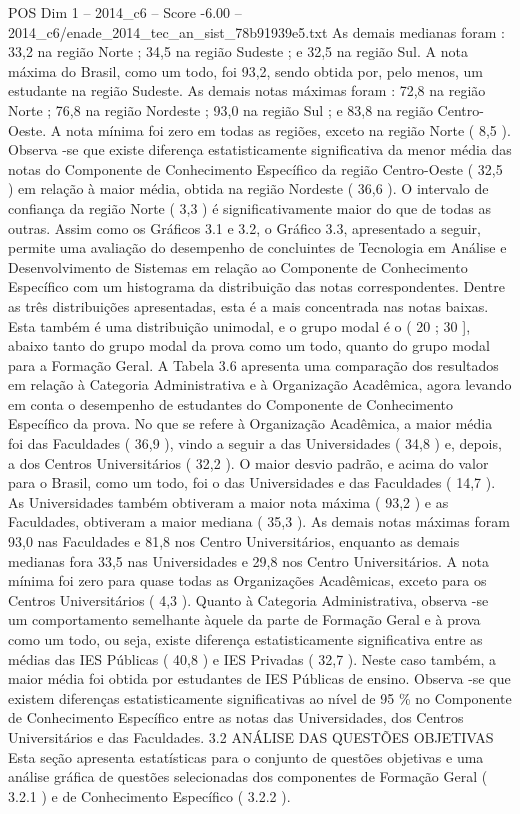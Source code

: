 \begin{textsample}{POS Dim 1 – 2014\_c6 – Score -6.00 – 2014\_c6/enade\_2014\_tec\_an\_sist\_78b91939e5.txt}
As demais medianas foram : 33,2 na região Norte ; 34,5 na região Sudeste ; e 32,5 na região Sul.
A nota máxima do Brasil, como um todo, foi 93,2, sendo obtida por, pelo menos, um estudante na região Sudeste.
As demais notas máximas foram : 72,8 na região Norte ; 76,8 na região Nordeste ; 93,0 na região Sul ; e 83,8 na região Centro-Oeste.
A nota mínima foi zero em todas as regiões, exceto na região Norte ( 8,5 ).
Observa -se que existe diferença estatisticamente significativa da menor média das notas do Componente de Conhecimento Específico da região Centro-Oeste ( 32,5 ) em relação à maior média, obtida na região Nordeste ( 36,6 ).
O intervalo de confiança da região Norte ( 3,3 ) é significativamente maior do que de todas as outras.
Assim como os Gráficos 3.1 e 3.2, o Gráfico 3.3, apresentado a seguir, permite uma avaliação do desempenho de concluintes de Tecnologia em Análise e Desenvolvimento de Sistemas em relação ao Componente de Conhecimento Específico com um histograma da distribuição das notas correspondentes.
Dentre as três distribuições apresentadas, esta é a mais concentrada nas notas baixas.
Esta também é uma distribuição unimodal, e o grupo modal é o ( 20 ; 30 ], abaixo tanto do grupo modal da prova como um todo, quanto do grupo modal para a Formação Geral.
A Tabela 3.6 apresenta uma comparação dos resultados em relação à Categoria Administrativa e à Organização Acadêmica, agora levando em conta o desempenho de estudantes do Componente de Conhecimento Específico da prova.
No que se refere à Organização Acadêmica, a maior média foi das Faculdades ( 36,9 ), vindo a seguir a das Universidades ( 34,8 ) e, depois, a dos Centros Universitários ( 32,2 ).
O maior desvio padrão, e acima do valor para o Brasil, como um todo, foi o das Universidades e das Faculdades ( 14,7 ).
As Universidades também obtiveram a maior nota máxima ( 93,2 ) e as Faculdades, obtiveram a maior mediana ( 35,3 ).
As demais notas máximas foram 93,0 nas Faculdades e 81,8 nos Centro Universitários, enquanto as demais medianas fora 33,5 nas Universidades e 29,8 nos Centro Universitários.
A nota mínima foi zero para quase todas as Organizações Acadêmicas, exceto para os Centros Universitários ( 4,3 ).
Quanto à Categoria Administrativa, observa -se um comportamento semelhante àquele da parte de Formação Geral e à prova como um todo, ou seja, existe diferença estatisticamente significativa entre as médias das IES Públicas ( 40,8 ) e IES Privadas ( 32,7 ).
Neste caso também, a maior média foi obtida por estudantes de IES Públicas de ensino.
Observa -se que existem diferenças estatisticamente significativas ao nível de 95 \% no Componente de Conhecimento Específico entre as notas das Universidades, dos Centros Universitários e das Faculdades. 3.2 ANÁLISE DAS QUESTÕES OBJETIVAS Esta seção apresenta estatísticas para o conjunto de questões objetivas e uma análise gráfica de questões selecionadas dos componentes de Formação Geral ( 3.2.1 ) e de Conhecimento Específico ( 3.2.2 ).

\end{textsample}
